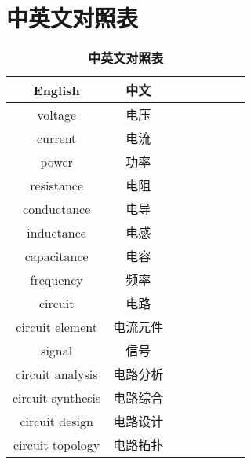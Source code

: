 \documentclass[UTF8]{report}
\theoremstyle{MyLineTheoremStyle} %
\theoremstyle{MyBlockTheoremStyle} %
\theoremstyle{MySubsubsectionStyle} %
\begin{document}
\section{中英文对照表}
\begin{multicols}{2}  

   \begin{table}[H]\centering
   \caption{\textbf{中英文对照表}}
   \begin{tabular}{cccccccc}\toprule
       English & 中文 \\
       \midrule
       voltage            & 电压 \\
       current            & 电流 \\
       power              & 功率 \\
       resistance         & 电阻 \\
       conductance        & 电导 \\
       inductance         & 电感 \\
       capacitance        & 电容 \\
       frequency          & 频率 \\
       circuit            & 电路 \\
       circuit element    & 电流元件 \\
       signal             & 信号 \\
       circuit analysis   & 电路分析 \\
       circuit synthesis  & 电路综合 \\
       circuit design     & 电路设计 \\
       circuit topology   & 电路拓扑 \\
       \bottomrule
   \end{tabular}
   \end{table}
    

\end{multicols}
\end{document}
